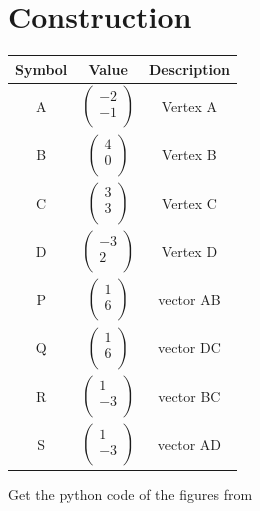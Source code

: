 \documentclass[journal,12pt,twocolumn]{IEEEtran}
\begin{document}
\section*{Construction}
\centering
\vspace{0.2cm}
{
\setlength\extrarowheight{2pt}
\begin{tabular}{|c|c|c|}
	\hline
	\textbf{Symbol}&\textbf{Value}&\textbf{Description}\\
	\hline
	A & $\begin{pmatrix}-2 \\ -1 \\ \end{pmatrix}$ & Vertex A\\
	\hline
	B & $\begin{pmatrix}4 \\ 0 \\ \end{pmatrix}$ & Vertex B\\
	\hline
	C &$\begin{pmatrix}3 \\ 3 \\ \end{pmatrix}$ & Vertex C\\
	\hline
	D & $\begin{pmatrix}-3 \\ 2 \\ \end{pmatrix}$ & Vertex D\\
	\hline
	P &$\begin{pmatrix}1 \\ 6 \\ \end{pmatrix}$&vector AB\\
	\hline
	Q&$\begin{pmatrix}1 \\ 6 \\ \end{pmatrix}$&vector DC\\
	\hline
	R&$\begin{pmatrix}1 \\ -3 \\ \end{pmatrix}$&vector BC\\
	\hline
	S&$\begin{pmatrix}1 \\ -3 \\ \end{pmatrix}$&vector AD\\
	\hline
\end{tabular}
}

\vspace{0.6cm}
Get the python code of the figures from
\begin{table}[h]
\large
\centering
{}


\end{table}
\end{document}
